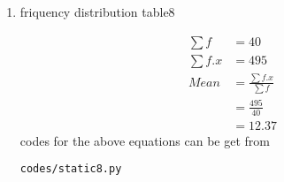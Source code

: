 \renewcommand{\theequation}{\theenumi}
\begin{enumerate}[label=\arabic*.,ref=\thesubsection.\theenumi]
\item \begin{table}[!ht]
	\centering
	
	\caption{friquency distribution table8 }
\end{table}
\begin{align}
\sum{f} &= 40
\\
\sum{f.x} &= 495
\\
Mean &= \frac{\sum{f.x}}{\sum{f}}
\\ &= \frac{495}{40}
\\&= 12.37
\end{align}
codes for the above equations can be get from
\begin{lstlisting}
codes/static8.py
\end{lstlisting}
\end{enumerate}